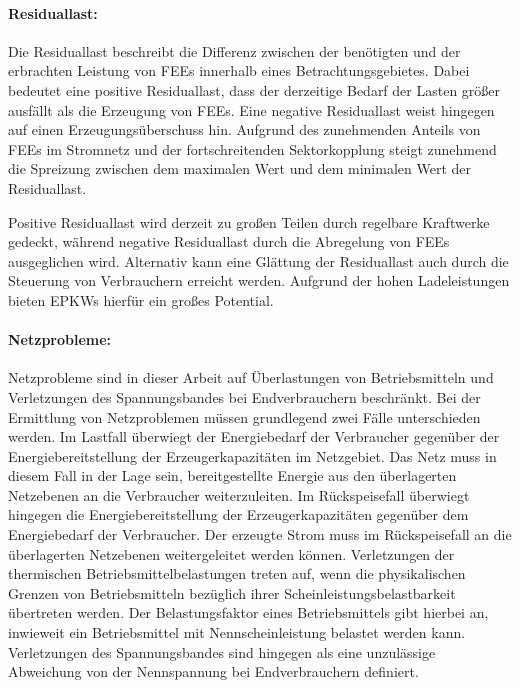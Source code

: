 \paragraph{Residuallast:}

Die Residuallast beschreibt die Differenz zwischen der benötigten und der erbrachten Leistung von \glspl{FEE} innerhalb eines Betrachtungsgebietes.
Dabei bedeutet eine positive Residuallast, dass der derzeitige Bedarf der Lasten größer ausfällt als die Erzeugung von \glspl{FEE}.
Eine negative Residuallast weist hingegen auf einen Erzeugungsüberschuss hin.
Aufgrund des zunehmenden Anteils von \glspl{FEE} im Stromnetz und der fortschreitenden Sektorkopplung steigt zunehmend die Spreizung zwischen dem maximalen Wert und dem minimalen Wert der Residuallast.

Positive Residuallast wird derzeit zu großen Teilen durch regelbare Kraftwerke gedeckt, während negative Residuallast durch die Abregelung von \glspl{FEE} ausgeglichen wird.
Alternativ kann eine Glättung der Residuallast auch durch die Steuerung von Verbrauchern erreicht werden.
Aufgrund der hohen Ladeleistungen bieten \glspl{EPKW} hierfür ein großes Potential. \cite{Paschotta2020a}


\paragraph{Netzprobleme:}

Netzprobleme sind in dieser Arbeit auf Überlastungen von Betriebsmitteln und Verletzungen des Spannungsbandes bei Endverbrauchern beschränkt.
Bei der Ermittlung von Netzproblemen müssen grundlegend zwei Fälle unterschieden werden.
Im Lastfall überwiegt der Energiebedarf der Verbraucher gegenüber der Energiebereitstellung der Erzeugerkapazitäten im Netzgebiet.
Das Netz muss in diesem Fall in der Lage sein, bereitgestellte Energie aus den überlagerten Netzebenen an die Verbraucher weiterzuleiten.
Im Rückspeisefall überwiegt hingegen die Energiebereitstellung der Erzeugerkapazitäten gegenüber dem Energiebedarf der Verbraucher.
Der erzeugte Strom muss im Rückspeisefall an die überlagerten Netzebenen weitergeleitet werden können.
Verletzungen der thermischen Betriebsmittelbelastungen treten auf, wenn die physikalischen Grenzen von Betriebsmitteln bezüglich ihrer Scheinleistungsbelastbarkeit übertreten werden.
Der Belastungsfaktor eines Betriebsmittels gibt hierbei an, inwieweit ein Betriebsmittel mit Nennscheinleistung belastet werden kann.
Verletzungen des Spannungsbandes sind hingegen als eine unzulässige Abweichung von der Nennspannung bei Endverbrauchern definiert. \cite{Agora2019} \cite{Rehtanz2017}


